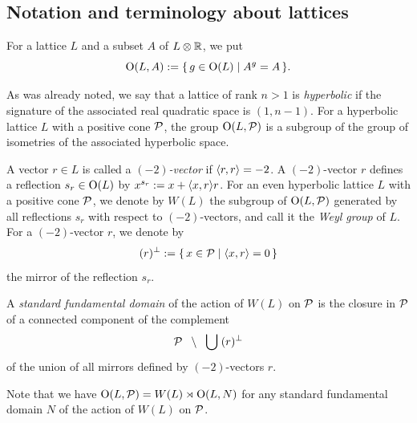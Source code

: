 \documentclass{amsart} %
\begin{document}
\subsection{Notation and terminology about lattices}\label{subsec:notationlat}
%
For a lattice $L$ and a subset $A$ of $L\otimes \mathord{\mathbb{R}}$,
we put
\[
\mathord{\mathrm{O}}(L, A):=\{\,{g\in \mathord{\mathrm{O}}(L)}\mid {A^g=A} \,\}.
\]
\par
As was already noted,
we say that a lattice of rank $n>1$ is \emph{hyperbolic}
if the signature of the associated real quadratic space is $(1, n-1)$.
For a hyperbolic lattice $L$ with a positive cone $\mathord{\mathcal{P}}$,
the group
$\mathord{\mathrm{O}}(L, \mathord{\mathcal{P}})$ is a subgroup of the group of isometries of the associated hyperbolic space.
\par %
A vector $r\in L$ is called a \emph{$(-2)$-vector} if $\langle r, r \rangle=-2$.
A $(-2)$-vector $r$ defines a reflection 
$s_r\in \mathord{\mathrm{O}}(L)$ by $x^{s_r}:=x+\langle x, r \rangle r$.
For an even hyperbolic lattice $L$ with a positive cone $\mathord{\mathcal{P}}$,
we denote by $W(L)$ the subgroup of $\mathord{\mathrm{O}}(L, \mathord{\mathcal{P}})$
generated by all reflections $s_r$ with respect to $(-2)$-vectors,
and call it the \emph{Weyl group} of $L$.
For a $(-2)$-vector $r$,
we denote by
\[
(r)^{\perp}:=\{\,{x\in \mathord{\mathcal{P}}}\mid {\langle x, r \rangle=0} \,\}
\]
the mirror of the reflection $s_r$.
%
\begin{definition}
A \emph{standard fundamental domain} of the action of $W(L)$ on $\mathord{\mathcal{P}}$
is the closure in $ \mathord{\mathcal{P}}$ of a connected component of the complement 
\[
\mathord{\mathcal{P}}\;\;\setminus \;\;\bigcup\; (r)^{\perp}
\]
of the union of all mirrors defined by $(-2)$-vectors $r$.
\end{definition}
%
Note that we have $\mathord{\mathrm{O}}(L, \mathord{\mathcal{P}})=W(L)\rtimes \mathord{\mathrm{O}}(L, N)$
for any standard fundamental domain $N$ of the action of $W(L)$ on $\mathord{\mathcal{P}}$.
%
\end{document}
